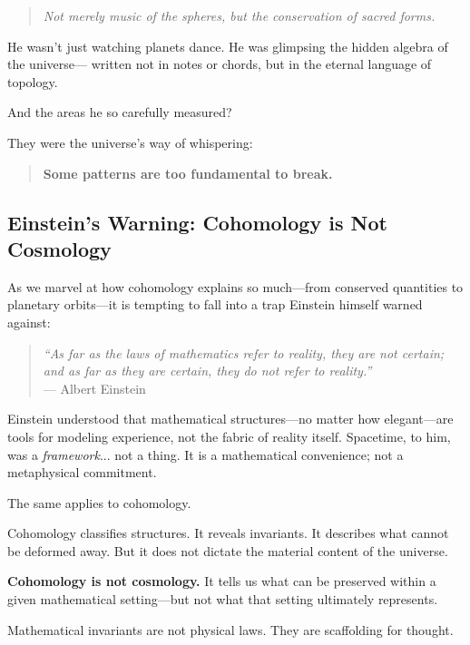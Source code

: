 \begin{tcolorbox}[colback=blue!5!white, colframe=blue!50!black, breakable, title={Historical Sidebar: If Kepler Had Known Cohomology}]
    \begin{quote} \textit{Not merely music of the spheres,
    but the conservation of sacred forms.} \end{quote}
    
    He wasn’t just watching planets dance.
    He was glimpsing the hidden algebra of the universe—
    written not in notes or chords, but in the eternal language of topology.
    
    And the areas he so carefully measured?
    
    They were the universe's way of whispering:
    
    \begin{quote} \textbf{Some patterns are too fundamental to break.} \end{quote}
    
\end{tcolorbox}


\subsection{Einstein’s Warning: Cohomology is Not Cosmology}

As we marvel at how cohomology explains so much—from conserved quantities to planetary orbits—it is tempting to fall into a trap Einstein himself warned against:

\begin{quote}
\textit{“As far as the laws of mathematics refer to reality, they are not certain;  and as far as they are certain, they do not refer to reality.”}  
\\[-0.5em]
\hfill --- Albert Einstein
\end{quote}

Einstein understood that mathematical structures—no matter how elegant—are tools for modeling experience, not the fabric of reality itself.  Spacetime, to him, was a \textit{framework}... not a thing. It is a mathematical convenience; not a metaphysical commitment.

\medskip

The same applies to cohomology.

Cohomology classifies structures. It reveals invariants. It describes what cannot be deformed away.  
But it does not dictate the material content of the universe. 

\begin{tcolorbox}[colback=red!5!white, colframe=red!50!black, title={Cautionary Note}]
\textbf{Cohomology is not cosmology.}  
It tells us what can be preserved within a given mathematical setting—but not what that setting ultimately represents.

Mathematical invariants are not physical laws. They are scaffolding for thought.
\end{tcolorbox}

